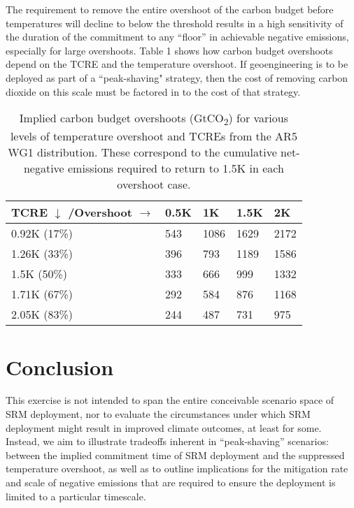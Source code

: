 \documentclass[draft]{agujournal2019}
\begin{document}
\medskip

The requirement to remove the entire overshoot of the carbon budget before temperatures will decline to below the threshold results in a high sensitivity of the duration of the commitment to any ``floor'' in achievable negative emissions, especially for large overshoots. Table 1 shows how carbon budget overshoots depend on the TCRE and the temperature overshoot. If geoengineering is to be deployed as part of a ``peak-shaving" strategy, then the cost of removing carbon dioxide on this scale must be factored in to the cost of that strategy.

\medskip


\begin{table}[!h]

\def\arraystretch{2}
\centering

\begin{tabular}{|l|l|l|l|l|}
\hline
\textbf{TCRE $\downarrow$ /Overshoot $\rightarrow$} &   0.5K   &   1K &   1.5K & 2K   \\ \hline
0.92K (17\%)            & 543  & 1086 & 1629 & 2172 \\ \hline
1.26K (33\%)            & 396  & 793  & 1189 & 1586 \\ \hline
1.5K (50\%)             & 333  & 666  & 999  & 1332 \\ \hline
1.71K (67\%)            & 292  & 584  & 876  & 1168 \\ \hline
2.05K (83\%)            & 244  & 487  & 731  & 975  \\ \hline
\end{tabular}

\caption{Implied carbon budget overshoots (GtCO\textsubscript{2}) for various levels of temperature overshoot and TCREs from the AR5 WG1 distribution. These correspond to the cumulative net-negative emissions required to return to 1.5K in each overshoot case.} 
\end{table}

\medskip

\section{Conclusion}

This exercise is not intended to span the entire conceivable scenario space of SRM deployment, nor to evaluate the circumstances under which SRM deployment might result in improved climate outcomes, at least for some. Instead, we aim to illustrate tradeoffs inherent in “peak-shaving” scenarios: between the implied commitment time of SRM deployment and the suppressed temperature overshoot, as well as to outline implications for the mitigation rate and scale of negative emissions that are required to ensure the deployment is limited to a particular timescale. 
\end{document}

